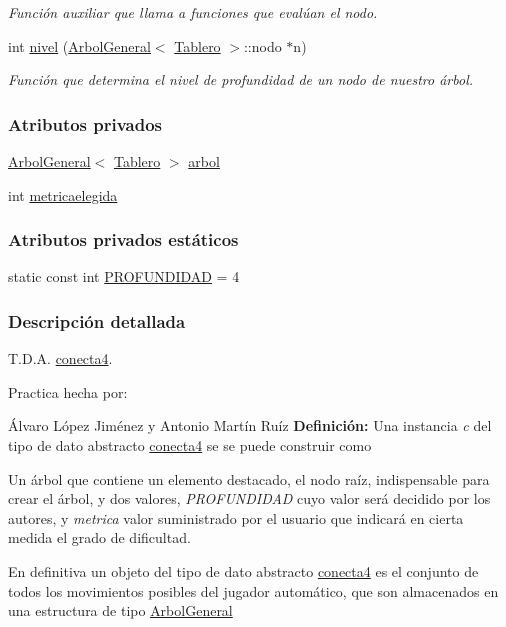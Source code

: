 \begin{DoxyCompactItemize}
\begin{DoxyCompactList}\small\item\em Función auxiliar que llama a funciones que evalúan el nodo. \end{DoxyCompactList}\item 
int \hyperlink{classconecta4_ad0c86056a0611fdf8032c25cccaf3d76}{nivel} (\hyperlink{classArbolGeneral}{Arbol\-General}$<$ \hyperlink{classTablero}{Tablero} $>$\-::nodo $\ast$n)
\begin{DoxyCompactList}\small\item\em Función que determina el nivel de profundidad de un nodo de nuestro árbol. \end{DoxyCompactList}\end{DoxyCompactItemize}
\subsubsection*{Atributos privados}
\begin{DoxyCompactItemize}
\item 
\hyperlink{classArbolGeneral}{Arbol\-General}$<$ \hyperlink{classTablero}{Tablero} $>$ \hyperlink{classconecta4_ad43e13dbc348258afc4995fa5c3239a6}{arbol}
\item 
int \hyperlink{classconecta4_a864ebc749eeed1ce602f2244c11bf85c}{metricaelegida}
\end{DoxyCompactItemize}
\subsubsection*{Atributos privados estáticos}
\begin{DoxyCompactItemize}
\item 
static const int \hyperlink{classconecta4_abcb731b830e10e986e26775961c33e88}{P\-R\-O\-F\-U\-N\-D\-I\-D\-A\-D} = 4
\end{DoxyCompactItemize}


\subsubsection{Descripción detallada}
T.\-D.\-A. \hyperlink{classconecta4}{conecta4}. 

Practica hecha por\-:

Álvaro López Jiménez y Antonio Martín Ruíz {\bfseries Definición\-:} Una instancia {\itshape c} del tipo de dato abstracto \hyperlink{classconecta4}{conecta4} se se puede construir como


\begin{DoxyItemize}
\item Un árbol que contiene un elemento destacado, el nodo raíz, indispensable para crear el árbol, y dos valores, {\itshape P\-R\-O\-F\-U\-N\-D\-I\-D\-A\-D} cuyo valor será decidido por los autores, y {\itshape metrica} valor suministrado por el usuario que indicará en cierta medida el grado de dificultad.

En definitiva un objeto del tipo de dato abstracto \hyperlink{classconecta4}{conecta4} es el conjunto de todos los movimientos posibles del jugador automático, que son almacenados en una estructura de tipo \hyperlink{classArbolGeneral}{Arbol\-General}
\end{DoxyItemize}

